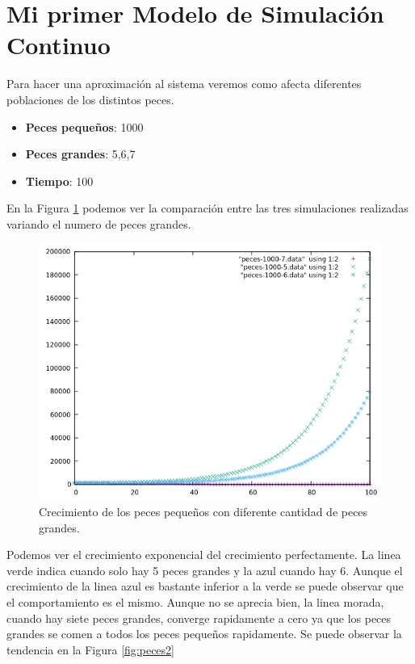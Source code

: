 \documentclass[12pt,a4paper]{article}
\begin{document}
\section{Mi primer Modelo de Simulación Continuo}
Para hacer una aproximación al sistema veremos como afecta diferentes poblaciones de los distintos peces.\\
\begin{itemize}
	\item \textbf{Peces pequeños}: 1000
	\item \textbf{Peces grandes}: 5,6,7
	\item \textbf{Tiempo}: 100
\end{itemize}
En la Figura \ref{fig:peces1} podemos ver la comparación entre las tres simulaciones realizadas variando el numero de peces grandes.
\begin{figure}[H]
	\centering
	\includegraphics{images/peces-1000-5-7.png}
	\caption{Crecimiento de los peces pequeños con diferente cantidad de peces grandes.}
	\label{fig:peces1}
\end{figure}
Podemos ver el crecimiento exponencial del crecimiento perfectamente. La linea verde indica cuando solo hay 5 peces grandes y la azul cuando hay 6. Aunque el crecimiento de la linea azul es bastante inferior a la verde se puede observar que el comportamiento es el mismo. Aunque no se aprecia bien, la linea morada, cuando hay siete peces grandes, converge rapidamente a cero ya que los peces grandes se comen a todos los peces pequeños rapidamente. Se puede observar la tendencia en la Figura \ref{fig:peces2}
\end{document}
